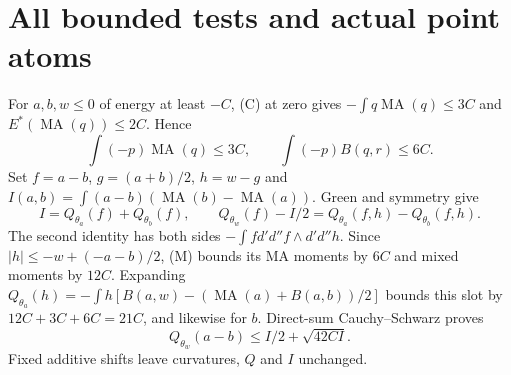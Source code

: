 \documentclass[11pt]{article}
\newcommand{\DD}{d'd''}
\newcommand{\MA}{\operatorname{MA}}
\theoremstyle{remark}\newtheorem{remark}[theorem]{Remark}
\begin{document}
\section{All bounded tests and actual point atoms}
For $a,b,w\le0$ of energy at least $-C$, (C) at zero gives
$-\int q\MA(q)\le3C$ and $E^*(\MA(q))\le2C$.
Hence
\[
\int(-p)\MA(q)\le3C,\qquad
\int(-p)B(q,r)\le6C.
\tag{M}
\]
Set $f=a-b$, $g=(a+b)/2$, $h=w-g$ and
$I(a,b)=\int(a-b)(\MA(b)-\MA(a))$.
Green and symmetry give
\[
I=Q_{\theta_a}(f)+Q_{\theta_b}(f),\qquad
Q_{\theta_w}(f)-I/2=Q_{\theta_a}(f,h)-Q_{\theta_b}(f,h).
\]
The second identity has both sides $-\int f\DD f\wedge\DD h$.
Since $|h|\le-w+(-a-b)/2$, (M) bounds its MA moments by $6C$
and mixed moments by $12C$. Expanding
$Q_{\theta_a}(h)=-\int h[B(a,w)-(\MA(a)+B(a,b))/2]$
bounds this slot by $12C+3C+6C=21C$, and likewise for $b$.
Direct-sum Cauchy--Schwarz proves
\[
Q_{\theta_w}(a-b)\le I/2+\sqrt{42CI}.
\tag{T}
\]
Fixed additive shifts leave curvatures, $Q$ and $I$ unchanged.
\end{document}
